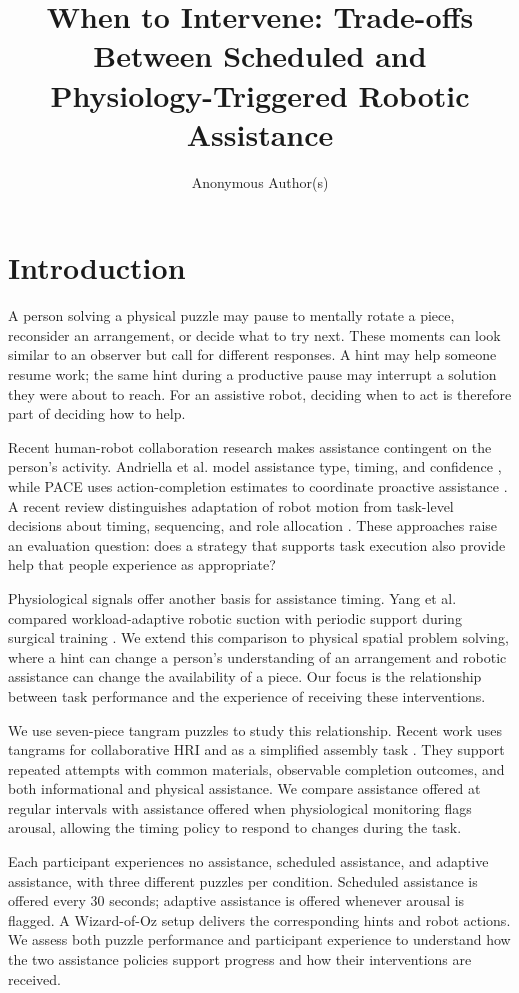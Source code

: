 \documentclass[sigconf,anonymous]{aamas}
\title{When to Intervene: Trade-offs Between Scheduled and Physiology-Triggered Robotic Assistance}
\author{Anonymous Author(s)}
\begin{document}
\maketitle

\section{Introduction}

A person solving a physical puzzle may pause to mentally rotate a piece, reconsider an arrangement, or decide what to try next. These moments can look similar to an observer but call for different responses. A hint may help someone resume work; the same hint during a productive pause may interrupt a solution they were about to reach. For an assistive robot, deciding when to act is therefore part of deciding how to help.

Recent human-robot collaboration research makes assistance contingent on the person's activity. Andriella et al. model assistance type, timing, and confidence \cite{andriella2025}, while PACE uses action-completion estimates to coordinate proactive assistance \cite{delazzari2025}. A recent review distinguishes adaptation of robot motion from task-level decisions about timing, sequencing, and role allocation \cite{karbouj2026}. These approaches raise an evaluation question: does a strategy that supports task execution also provide help that people experience as appropriate?

Physiological signals offer another basis for assistance timing. Yang et al. compared workload-adaptive robotic suction with periodic support during surgical training \cite{yang2024}. We extend this comparison to physical spatial problem solving, where a hint can change a person's understanding of an arrangement and robotic assistance can change the availability of a piece. Our focus is the relationship between task performance and the experience of receiving these interventions.

We use seven-piece tangram puzzles to study this relationship. Recent work uses tangrams for collaborative HRI and as a simplified assembly task \cite{tabatabaei2025,melo2026}. They support repeated attempts with common materials, observable completion outcomes, and both informational and physical assistance. We compare assistance offered at regular intervals with assistance offered when physiological monitoring flags arousal, allowing the timing policy to respond to changes during the task.

Each participant experiences no assistance, scheduled assistance, and adaptive assistance, with three different puzzles per condition. Scheduled assistance is offered every 30 seconds; adaptive assistance is offered whenever arousal is flagged. A Wizard-of-Oz setup delivers the corresponding hints and robot actions. We assess both puzzle performance and participant experience to understand how the two assistance policies support progress and how their interventions are received.
\end{document}
